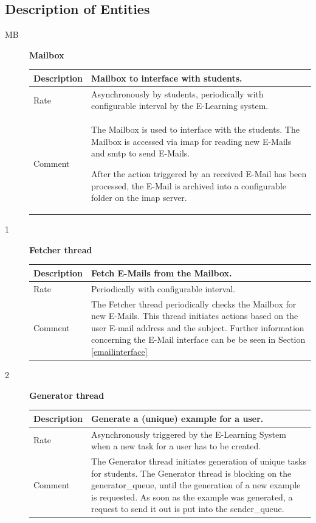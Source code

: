 \subsection{Description of Entities} \label{autosub_entities}
\begin{description}
    \item [MB] \textbf{Mailbox} \\
    \begin{tabular}{|p{2cm}|p{11cm}|}
        \hline
        Description & Mailbox to interface with students. \\
        \hline
        Rate & Asynchronously by students, periodically with configurable interval by
		the E-Learning system. \\
        \hline

        Comment & The Mailbox is used to interface with the students.
        The Mailbox is accessed via \gls{imap} for reading new E-Mails and \gls{smtp} 
		to send E-Mails.

        After the action triggered by an received E-Mail has been processed, the E-Mail 
		is archived into a configurable folder on the \gls{imap} server.
        \\
        \hline
    \end{tabular}
    \item [1] \textbf{Fetcher thread} \\
    \begin{tabular}{|p{2cm}|p{11cm}|}
        \hline
        Description &  Fetch E-Mails from the Mailbox.\\
        \hline
        Rate & Periodically with configurable interval. \\
        \hline
        Comment & The Fetcher thread periodically checks the Mailbox for new E-Mails. 
		This thread initiates actions based on the user E-mail address and the subject.
		Further information concerning the E-Mail interface can be be seen in Section 
		\ref{emailinterface} 
        \\
        \hline
    \end{tabular}

	\item [2] \textbf{Generator thread} \\
    \begin{tabular}{|p{2cm}|p{11cm}|}
        \hline
        Description & Generate a (unique) example for a user. \\
        \hline
        Rate & Asynchronously triggered  by the E-Learning System when a new task for a user has 
		to be created.\\
        \hline
        Comment & The Generator thread initiates generation of unique tasks for students.
  		The Generator thread is blocking on the generator\_queue, until the generation 
		of a new example is requested. As soon as the example was generated, a request 
		to send it out is put into the sender\_queue.
        \\
        \hline
    \end{tabular}
   

\end{description}
